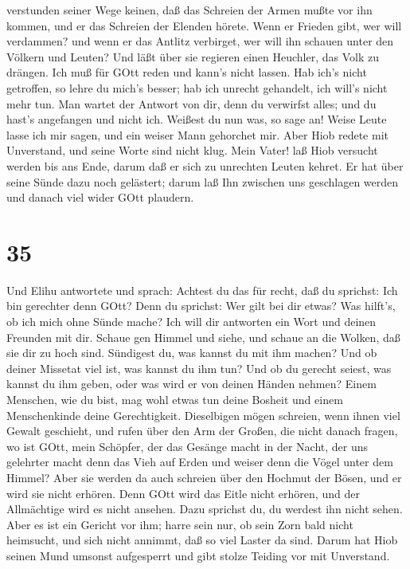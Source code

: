 verstunden seiner Wege keinen,  daß das Schreien der Armen
mußte vor ihn kommen, und er das Schreien der Elenden hörete.
 Wenn er Frieden gibt, wer will verdammen? und wenn er das
Antlitz verbirget, wer will ihn schauen unter den Völkern und Leuten?
 Und läßt über sie regieren einen Heuchler, das Volk zu
drängen.  Ich muß für GOtt reden und kann's nicht lassen.
 Hab ich's nicht getroffen, so lehre du mich's besser; hab
ich unrecht gehandelt, ich will's nicht mehr tun.  Man
wartet der Antwort von dir, denn du verwirfst alles; und du hast's
angefangen und nicht ich. Weißest du nun was, so sage an! 
Weise Leute lasse ich mir sagen, und ein weiser Mann gehorchet mir.
 Aber Hiob redete mit Unverstand, und seine Worte sind
nicht klug.  Mein Vater! laß Hiob versucht werden bis ans
Ende, darum daß er sich zu unrechten Leuten kehret.  Er hat
über seine Sünde dazu noch gelästert; darum laß Ihn zwischen uns
geschlagen werden und danach viel wider GOtt plaudern.

\hypertarget{section-34}{%
\section{35}\label{section-34}}

 Und Elihu antwortete und sprach:  Achtest du
das für recht, daß du sprichst: Ich bin gerechter denn GOtt?
 Denn du sprichst: Wer gilt bei dir etwas? Was hilft's, ob
ich mich ohne Sünde mache?  Ich will dir antworten ein Wort
und deinen Freunden mit dir.  Schaue gen Himmel und siehe,
und schaue an die Wolken, daß sie dir zu hoch sind. 
Sündigest du, was kannst du mit ihm machen? Und ob deiner Missetat viel
ist, was kannst du ihm tun?  Und ob du gerecht seiest, was
kannst du ihm geben, oder was wird er von deinen Händen nehmen?
 Einem Menschen, wie du bist, mag wohl etwas tun deine
Bosheit und einem Menschenkinde deine Gerechtigkeit. 
Dieselbigen mögen schreien, wenn ihnen viel Gewalt geschieht, und rufen
über den Arm der Großen,  die nicht danach fragen, wo ist
GOtt, mein Schöpfer, der das Gesänge macht in der Nacht, 
der uns gelehrter macht denn das Vieh auf Erden und weiser denn die
Vögel unter dem Himmel?  Aber sie werden da auch schreien
über den Hochmut der Bösen, und er wird sie nicht erhören. 
Denn GOtt wird das Eitle nicht erhören, und der Allmächtige wird es
nicht ansehen.  Dazu sprichst du, du werdest ihn nicht
sehen. Aber es ist ein Gericht vor ihm; harre sein nur,  ob
sein Zorn bald nicht heimsucht, und sich nicht annimmt, daß so viel
Laster da sind.  Darum hat Hiob seinen Mund umsonst
aufgesperrt und gibt stolze Teiding vor mit Unverstand.

